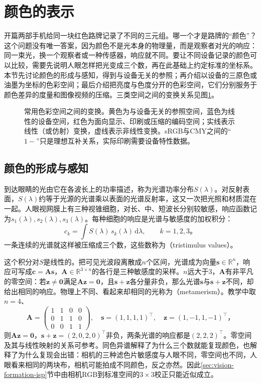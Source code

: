 \section{颜色的表示}
\label{sec:vision-formation-color}

开篇两部手机给同一块红色路牌记录了不同的三元组。哪一个才是路牌的“颜色”？这个问题没有唯一答案，因为颜色不是光本身的物理量，而是观察者对光的响应：同一束光，换一个观察者或一种传感器，响应就不同。要让不同设备记录的颜色可以比较，需要先说明人眼怎样把光变成三个数，再在此基础上约定标准的坐标系。本节先讨论颜色的形成与感知，得到与设备无关的参照；再介绍以设备的三原色或油墨为坐标的色彩空间；最后介绍把亮度与色度分开的色彩空间，它们分别服务于颜色差异的度量和图像视频的压缩。三类空间之间的变换关系见图\ref{fig:vision-formation-color-spaces}。

\begin{figure}[htbp]
  \centering
  
  \caption{常用色彩空间之间的变换。黄色为与设备无关的参照空间，蓝色为线性的设备空间，红色为面向显示、印刷或压缩的编码空间；实线表示线性（或仿射）变换，虚线表示非线性变换。sRGB与CMY之间的“$1-$”只是理想互补关系，实际印刷需要设备特性数据。}
  \label{fig:vision-formation-color-spaces}
\end{figure}

\subsection{颜色的形成与感知}
\label{sec:vision-formation-color-perception}

到达眼睛的光由它在各波长上的功率描述，称为光谱功率分布$S(\lambda)$。对反射表面，$S(\lambda)$约等于光源的光谱乘以表面的光谱反射率，这又一次把光照和材质混在一起。人眼视网膜上有三种视锥细胞，对长、中、短波长分别较敏感，响应函数记为$s_1(\lambda),s_2(\lambda),s_3(\lambda)$。每种细胞的响应是光谱与敏感度的加权积分：
\[
  c_k=\int S(\lambda)\,s_k(\lambda)\,\mathrm{d}\lambda,\qquad k=1,2,3\text{。}
\]
一条连续的光谱就这样被压缩成三个数，这些数称为（tristimulus values）。

这个积分对$S$是线性的。把可见光波段离散成$n$个区间，光谱成为向量$\bm s\in\mathbb{R}^n$，响应可写成$\bm c=\bm A\bm s$，$\bm A\in\mathbb{R}^{3\times n}$的各行是三种敏感度的采样。$n$远大于3，$\bm A$有非平凡的零空间：若$\bm z\ne\bm0$满足$\bm A\bm z=\bm0$，且$\bm s+\bm z$各分量非负，那么光谱$\bm s$与$\bm s+\bm z$不同，却给出相同的响应。物理上不同、看起来却相同的光称为（metamerism）。教学中取$n=4$、
\[
  \bm A=\begin{pmatrix}1&1&0&0\\0&1&1&0\\0&0&1&1\end{pmatrix},\quad
  \bm s=(1,1,1,1)^\top,\quad \bm z=(1,-1,1,-1)^\top\text{，}
\]
则$\bm A\bm z=\bm0$，$\bm s+\bm z=(2,0,2,0)^\top$非负，两条光谱的响应都是$(2,2,2)^\top$。零空间及其与线性映射的关系可参考。同色异谱解释了为什么三个数就能复现颜色，也解释了为什么复现会出错：相机的三种滤色片敏感度与人眼不同，零空间也不同，人眼看来相同的两块布，相机可能拍成不同颜色，反之亦然。因此\ref{sec:vision-formation-isp}节中由相机RGB到标准空间的$3\times3$校正只能近似成立。

